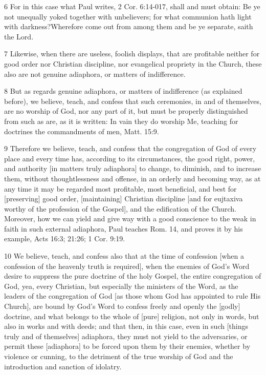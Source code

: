 {6 For in this case what Paul writes, 2 Cor. 6:14-017, shall and must obtain: Be ye not unequally yoked together with unbelievers; for what communion hath light with darkness?Wherefore come out from among them and be ye separate, saith the Lord.

7 Likewise, when there are useless, foolish displays, that are profitable neither for good order nor Christian discipline, nor evangelical propriety in the Church, these also are not genuine adiaphora, or matters of indifference.

8 But as regards genuine adiaphora, or matters of indifference (as explained before), we believe, teach, and confess that such ceremonies, in and of themselves, are no worship of God, nor any part of it, but must be properly distinguished from such as are, as it is written: In vain they do worship Me, teaching for doctrines the commandments of men, Matt. 15:9.

9 Therefore we believe, teach, and confess that the congregation of God of every place and every time has, according to its circumstances, the good right, power, and authority [in matters truly adiaphora] to change, to diminish, and to increase them, without thoughtlessness and offense, in an orderly and becoming way, as at any time it may be regarded most profitable, most beneficial, and best for [preserving] good order, [maintaining] Christian discipline [and for eujtaxiva worthy of the profession of the Gospel], and the edification of the Church. Moreover, how we can yield and give way with a good conscience to the weak in faith in such external adiaphora, Paul teaches Rom. 14, and proves it by his example, Acts 16:3; 21:26; 1 Cor. 9:19.

10 We believe, teach, and confess also that at the time of confession [when a confession of the heavenly truth is required], when the enemies of God’s Word desire to suppress the pure doctrine of the holy Gospel, the entire congregation of God, yea, every Christian, but especially the ministers of the Word, as the leaders of the congregation of God [as those whom God has appointed to rule His Church], are bound by God’s Word to confess freely and openly the [godly] doctrine, and what belongs to the whole of [pure] religion, not only in words, but also in works and with deeds; and that then, in this case, even in such [things truly and of themselves] adiaphora, they must not yield to the adversaries, or permit these [adiaphora] to be forced upon them by their enemies, whether by violence or cunning, to the detriment of the true worship of God and the introduction and sanction of idolatry.

}
